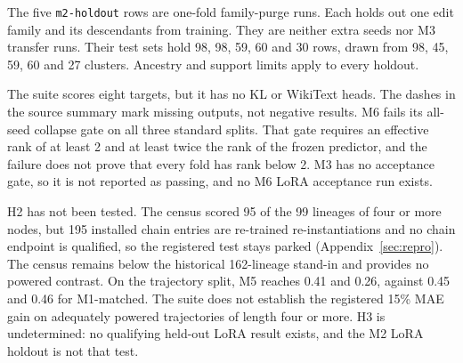 The five \texttt{m2-holdout} rows are one-fold family-purge runs. Each holds out one edit family and its descendants from training. They are neither extra seeds nor M3 transfer runs. Their test sets hold 98, 98, 59, 60 and 30 rows, drawn from 98, 45, 59, 60 and 27 clusters. Ancestry and support limits apply to every holdout.

The suite scores eight targets, but it has no KL or WikiText heads. The dashes in the source summary mark missing outputs, not negative results. M6 fails its all-seed collapse gate on all three standard splits. That gate requires an effective rank of at least 2 and at least twice the rank of the frozen predictor, and the failure does not prove that every fold has rank below 2. M3 has no acceptance gate, so it is not reported as passing, and no M6 LoRA acceptance run exists.

H2 has not been tested. The census scored 95 of the 99 lineages of four or more nodes, but 195 installed chain entries are re-trained re-instantiations and no chain endpoint is qualified, so the registered test stays parked (Appendix~\ref{sec:repro}). The census remains below the historical 162-lineage stand-in and provides no powered contrast. On the trajectory split, M5 reaches 0.41 and 0.26, against 0.45 and 0.46 for M1-matched. The suite does not establish the registered 15\% MAE gain on adequately powered trajectories of length four or more. H3 is undetermined: no qualifying held-out LoRA result exists, and the M2 LoRA holdout is not that test.

